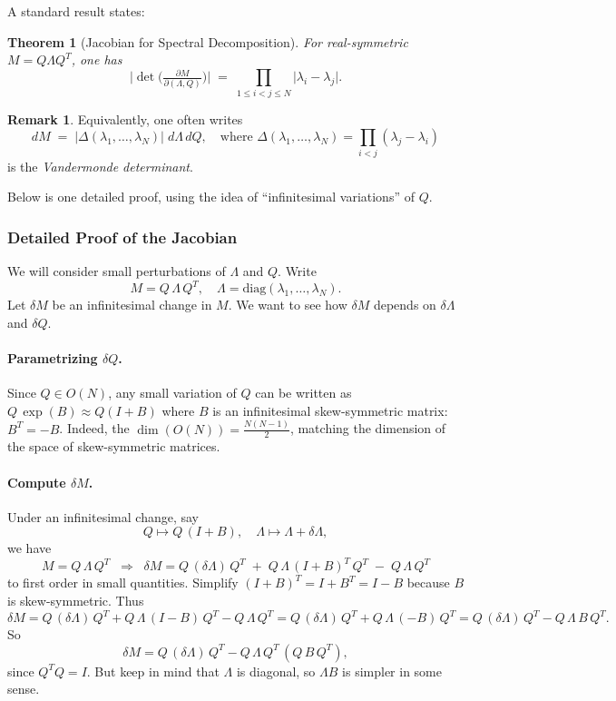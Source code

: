 \documentclass[letterpaper,11pt,oneside,reqno]{article}
\numberwithin{equation}{section}
\newtheorem{theorem}[proposition]{Theorem}
\theoremstyle{definition}
\newtheorem{remark}[proposition]{Remark}
\begin{document}
A standard result states:

\begin{theorem}[Jacobian for Spectral Decomposition]
\label{thm:Jacobian-GOE}
For real-symmetric \(M=Q\Lambda Q^T\), one has
\[
  \bigl|\det\bigl(\tfrac{\partial M}{\partial(\Lambda,Q)}\bigr)\bigr|
  \;=\;
  \prod_{1\le i<j\le N}
  \bigl|\lambda_i - \lambda_j\bigr|.
\]
\end{theorem}

\begin{remark}
Equivalently, one often writes
\[
  dM
  \;=\;
  \bigl|\Delta(\lambda_1,\dots,\lambda_N)\bigr|\;
  d\Lambda\,dQ,
  \quad\text{where }
  \Delta(\lambda_1,\dots,\lambda_N)
  = \prod_{i<j}(\lambda_j-\lambda_i)
\]
is the \emph{Vandermonde determinant}.
\end{remark}

Below is one detailed proof, using the idea of “infinitesimal variations” of \(Q\).

\subsubsection*{Detailed Proof of the Jacobian}

We will consider small perturbations of \(\Lambda\) and \(Q\).  Write
\[
  M = Q\,\Lambda\,Q^T,
  \quad
  \Lambda = \mathrm{diag}(\lambda_1,\dots,\lambda_N).
\]
Let \(\delta M\) be an infinitesimal change in \(M\). We want to see how \(\delta M\) depends on \(\delta\Lambda\) and \(\delta Q\).

\paragraph{Parametrizing \(\delta Q\).}
Since \(Q\in O(N)\), any small variation of \(Q\) can be written as \(Q\,\exp(B)\approx Q(I+B)\) where \(B\) is an infinitesimal skew-symmetric matrix: \(B^T=-B\). Indeed, the \(\dim(O(N)) = \tfrac{N(N-1)}{2}\), matching the dimension of the space of skew-symmetric matrices.

\paragraph{Compute \(\delta M\).}
Under an infinitesimal change, say
\[
  Q \mapsto Q\,(I + B),
  \quad
  \Lambda \mapsto \Lambda + \delta\Lambda,
\]
we have
\[
  M
  = Q\,\Lambda\,Q^T
  \;\;\Longrightarrow\;\;
  \delta M
  = Q\,(\delta \Lambda)\,Q^T
   \;+\;
    Q\,\Lambda\,(I+B)^T\,Q^T
   \;-\;
    Q\,\Lambda\,Q^T
\]
to first order in small quantities. Simplify \((I+B)^T = I + B^T = I - B\) because \(B\) is skew-symmetric. Thus
\[
  \delta M
  = Q\,(\delta\Lambda)\,Q^T
   + Q\,\Lambda\,(I - B)\,Q^T
   - Q\,\Lambda\,Q^T
  = Q\,(\delta\Lambda)\,Q^T
    + Q\,\Lambda\,(-B)\,Q^T
  = Q\,(\delta\Lambda)\,Q^T
    - Q\,\Lambda\,B\,Q^T.
\]
So
\[
  \delta M
  = Q\,(\delta\Lambda)\,Q^T
    - Q\,\Lambda\,Q^T \,(Q\,B\,Q^T),
\]
since \(Q^TQ=I\).  But keep in mind that \(\Lambda\) is diagonal, so \(\Lambda B\) is simpler in some sense.
\end{document}
